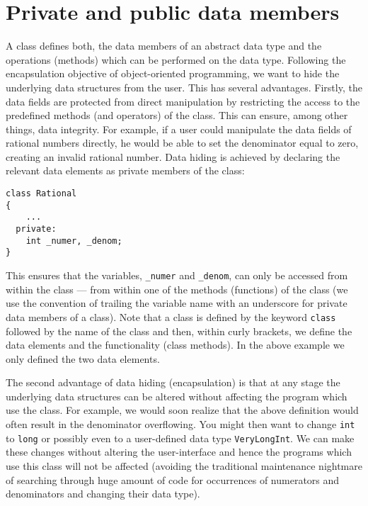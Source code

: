 
\section{Private and public data members}

A class defines both, the data members of an abstract data type and the
operations (methods) which can be performed on the data type. Following
the encapsulation objective of object-oriented programming, we want to
hide the underlying data structures from the user. This has several advantages.
Firstly, the data fields are protected from direct manipulation by restricting
the access to the predefined methods (and operators) of the class. This can
ensure, among other things, data integrity. For example, if a user could manipulate
the data fields of rational numbers directly, he would be able to set the
denominator equal to zero, creating an invalid rational number. Data
hiding is achieved by declaring the relevant data elements as private
members of the class:
{\footnotesize \begin{verbatim}
class Rational
{
    ...
  private:
    int _numer, _denom;
}
\end{verbatim}}
This ensures that the variables, \verb+_numer+ and \verb+_denom+, can only
be accessed from within the class --- from within one of the methods
(functions) of the class (we use the convention of trailing the variable name
with an underscore for private data members of a class).
Note that a class is defined by the keyword \verb+class+
followed by the name of the class and then, within curly brackets, we define
the data elements and the functionality (class methods). In the above example
we only defined the two data elements.

The second advantage of data hiding (encapsulation) is that at any stage
the underlying data structures can be altered without affecting the program
which use the class. For example, we would soon realize that the above
definition would often result in the denominator overflowing. You might
then want to change \verb+int+ to \verb+long+ or possibly even to a 
user-defined data type \verb+VeryLongInt+. We can make these changes
without altering the user-interface and hence the programs which use this 
class will not be affected (avoiding the traditional maintenance nightmare
of searching through huge amount of code for occurrences of numerators and
denominators and changing their data type).

